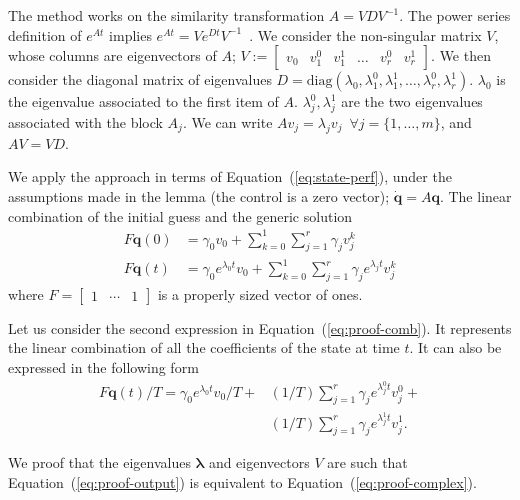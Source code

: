 \documentclass[letterpaper,10pt,conference]{ieeeconf}
\theoremstyle{definition}
\begin{document}
The method works on the similarity transformation $A=VDV^{-1}$. The power series definition of $e^{At}$ implies $e^{At}=Ve^{Dt}V^{-1}$~\cite{moler2003nineteen}. We consider the non-singular matrix $V$, whose columns are eigenvectors of $A$; $V:=\begin{bmatrix}v_0 & v_1^0 & v_1^1 & \dots & v_r^0 & v_r^1\end{bmatrix}$. We then consider the diagonal matrix of eigenvalues $D=\mathrm{diag}{(\lambda_0,\lambda_1^0,\lambda_1^1,\dots,\lambda_r^0,\lambda_r^1)}$. $\lambda_0$ is the eigenvalue associated to the first item of $A$. $\lambda_j^0,\lambda_j^1$ are the two eigenvalues associated with the block $A_j$. We can write $Av_j=\lambda_jv_j\,\,\,\forall j=\{1,\dots,m\}$, and $AV=VD$. 

We apply the approach in terms of Equation~(\ref{eq:state-perf}), under the assumptions made in the lemma (the control is a zero vector); $\dot{\mathbf{q}}=A\mathbf{q}$. The linear combination of the initial guess and the generic solution
\begin{equation}\label{eq:proof-comb}\begin{split}
  F\mathbf{q}(0)&=\gamma_0 v_0+\sum_{k=0}^{1}{\sum_{j=1}^{r}{\gamma_j v_j^k}}\\
  F\mathbf{q}(t)&=\gamma_0 e^{\lambda_0 t} v_0+\sum_{k=0}^{1}{\sum_{j=1}^{r}{\gamma_j e^{\lambda_j t} v_j^k}}
\end{split}\end{equation}
where $F=\begin{bmatrix}1 & \cdots & 1\end{bmatrix}$ is a properly sized vector of ones. 

Let us consider the second expression in Equation~(\ref{eq:proof-comb}). It represents the linear combination of all the coefficients of the state at time $t$. It can also be expressed in the following form
\begin{equation}\label{eq:proof-output}\begin{split}
  F\mathbf{q}(t)/T=\gamma_0 e^{\lambda_0t}v_0/T+&(1/T)\sum_{j=1}^r{\gamma_j e^{\lambda_j^0t}v_j^0}+\\&(1/T)\sum_{j=1}^r{\gamma_j e^{\lambda_j^1t}v_j^1}.
\end{split}\end{equation}

We proof that the eigenvalues $\mathbf{\lambda}$ and eigenvectors $V$ are such that Equation~(\ref{eq:proof-output}) is equivalent to Equation~(\ref{eq:proof-complex}).
\end{document}
